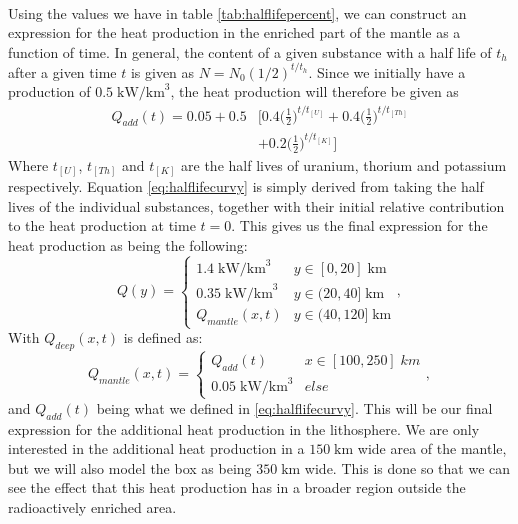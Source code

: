 \documentclass[reprint,english,notitlepage]{revtex4-1}  %
\begin{document}
\\
Using the values we have in table \ref{tab:halflifepercent}, we can construct an expression for the heat production in the enriched part of the mantle as a function of time. In general, the content of a given substance with a half life of $t_{h}$ after a given time $t$ is given as $N = N_0 (1/2)^{t/t_{h}}$. Since we initially have a production of $0.5\;\text{kW/km}^3$, the heat production will therefore be given as
\begin{equation}\label{eq:halflifecurvy}
    \begin{split}
    Q_{add}(t) = 0.05 + 0.5&\Bigg[0.4\Big(\frac{1}{2}\Big)^{t/t_{[U]}}+0.4\Big(\frac{1}{2}\Big)^{t/t_{[Th]}}\\ &+0.2\Big(\frac{1}{2}\Big)^{t/t_{[K]}}\Bigg]
    \end{split}
\end{equation}
Where $t_{[U]}$, $t_{[Th]}$ and $t_{[K]}$ are the half lives of uranium, thorium and potassium respectively. Equation \ref{eq:halflifecurvy} is simply derived from taking the half lives of the individual substances, together with their initial relative contribution to the heat production at time $t = 0$. This gives us the final expression for the heat production as being the following:
\begin{equation}
    Q(y) = \begin{cases} 1.4\;\text{kW/km}^3 & y \in [0,20]\;\text{km}\\0.35\;\text{kW/km}^3 & y \in (20,40]\;\text{km}\\Q_{mantle}(x,t) & y \in (40,120]\;\text{km} \end{cases}, 
\end{equation}
With $Q_{deep}(x,t)$ is defined as:
\begin{equation}
    Q_{mantle}(x,t) = \begin{cases} Q_{add}(t) & x\in [100,250]\;km\\0.05\;\text{kW/km}^3 & else\end{cases},
\end{equation}
and $Q_{add}(t)$ being what we defined in \ref{eq:halflifecurvy}. This will be our final expression for the additional heat production in the lithosphere. We are only interested in the additional heat production in a $150\;\text{km}$ wide area of the mantle, but we will also model the box as being $350\;\text{km}$ wide. This is done so that we can see the effect that this heat production has in a broader region outside the radioactively enriched area.
\end{document}
